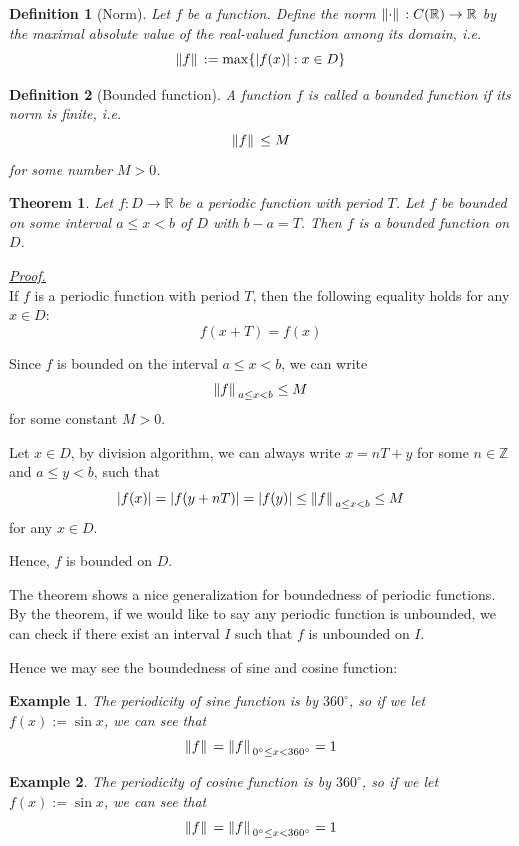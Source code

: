 \documentclass[12pt]{article}
\newtheorem{definition}{Definition}[section]
\newtheorem*{theorem}{Theorem}
\newtheorem*{example}{Example}
\renewenvironment{proof}[1][Proof]{\begin{snugshade*} \underline{\textit{{#1}.}}\\}{\hfill \qedsymbol \end{snugshade*}}
\begin{document}
    \begin{definition}[Norm]
        Let $f$ be a function. Define the norm $\norm*{\cdot}:C(\mathbb{R})\to\mathbb{R}$ by the maximal absolute value of the real-valued function among its domain, i.e. \[\norm*{f}:=\max\{|f(x)|:x\in D\}\] 
    \end{definition}

    \begin{definition}[Bounded function]
        A function $f$ is called a bounded function if its norm is finite, i.e. \[\norm*{f}\leq M\] for some number $M>0$.
    \end{definition}

    \begin{theorem}
        Let $f:D\to\mathbb{R}$ be a periodic function with period $T$. Let $f$ be bounded on some interval $a\leq x < b$ of $D$ with $b-a=T$. Then $f$ is a bounded function on $D$.
    \end{theorem}

    \begin{proof}
        If $f$ is a periodic function with period $T$, then the following equality holds for any $x\in D$: \[f(x+T)=f(x)\]

        Since $f$ is bounded on the interval $a\leq x < b$, we can write \[\norm*{f}_{a\leq x< b}\leq M\] for some constant $M>0$.

        Let $x\in D$, by division algorithm, we can always write $x=nT+y$ for some $n\in \mathbb{Z}$ and $a\leq y< b$, such that \[|f(x)|=|f(y+nT)|=|f(y)|\leq \norm*{f}_{a\leq x< b}\leq M\] for any $x\in D$.

        Hence, $f$ is bounded on $D$.
    \end{proof}

    The theorem shows a nice generalization for boundedness of periodic functions. By the theorem, if we would like to say any periodic function is unbounded, we can check if there exist an interval $I$ such that $f$ is unbounded on $I$.

    Hence we may see the boundedness of sine and cosine function:

    \begin{example}
        The periodicity of sine function is by $360^\circ$, so if we let $f(x):=\sin{x}$, we can see that \[\norm*{f}=\norm*{f}_{0^\circ \leq x< 360^\circ}=1\]
    \end{example}

    \begin{example}
        The periodicity of cosine function is by $360^\circ$, so if we let $f(x):=\sin{x}$, we can see that \[\norm*{f}=\norm*{f}_{0^\circ \leq x< 360^\circ}=1\]
    \end{example}
\end{document}
